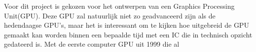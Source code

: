 Voor dit project is gekozen voor het ontwerpen van een Graphics Processing Unit(GPU). Deze GPU zal natuurlijk niet zo geadvanceerd zijn als de hedendaagse GPU's, maar het is interessant om te kijken hoe uitgebreid de GPU gemaakt kan worden binnen een bepaalde tijd met een IC die in technisch opzicht gedateerd is. Met de eerste computer GPU uit 1999 die al 